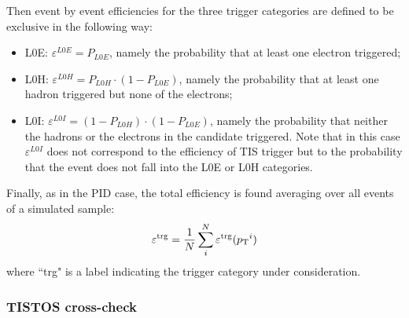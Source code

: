 Then event by event efficiencies for the three trigger categories are defined to be exclusive in the following way:
%
\begin{itemize}
\item L0E: $\varepsilon^{L0E} = P_{L0E}$, namely the probability that at least one electron triggered;
\item L0H: $\varepsilon^{L0H} = P_{L0H}\cdot(1 - P_{L0E})$, namely the probability that at least one hadron triggered but none of the electrons;
\item L0I: $\varepsilon^{L0I} = (1-P_{L0H})\cdot(1 - P_{L0E})$, namely the probability that neither the hadrons or the electrons in the candidate triggered. Note that in this case $\varepsilon^{L0I} $ does not correspond to the efficiency of TIS trigger but to the probability that the event does not fall into the L0E or L0H categories.
\end{itemize}
%
Finally, as in the PID case, the total efficiency is found averaging over all events of a simulated sample:
%
\begin{equation}
\varepsilon^{\rm trg} = \frac{1}{N} \sum_i^N \varepsilon^{\rm trg}(\mbox{$p_{\rm T}$}^i)
\end{equation}
\noindent
where ``trg" is a label indicating the trigger category under consideration.

\subsubsection{TISTOS cross-check}
\label{sec:tistos}

